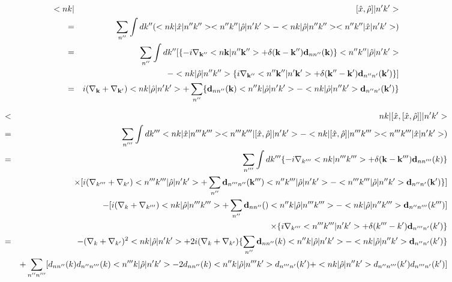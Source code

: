 \documentclass[aps,prb,preprint]{revtex4-1}
\begin{document}
\begin{appendix}
\begin{eqnarray}
<nk|&&[\hat{x},\hat{\rho}]|n'k'> \nonumber \\
=&& \sum_{n''} \int dk'' (<nk|\hat{x}|n''k''><n''k''|\hat{\rho}|n'k'> - <nk|\hat{\rho}|n''k''><n''k''|\hat{x}|n'k'>) \nonumber \\
=&& \sum_{n''} \int dk'' [ \{ -i \nabla_{\bf k''} <n{\bf k}|n''{\bf k''}> + \delta({\bf k-k''}) {\bf d}_{nn''}({\bf k}) \}<n''k''|\hat{\rho}|n'k'> \nonumber \\
&& - <nk|\hat{\rho}|n''k''>\{ i \nabla_{\bf k''} <n''{\bf k''}|n'{\bf k'}> + \delta({\bf k''-k'}) {\bf d}_{n''n'}({\bf k'}) \} ] \nonumber \\
=&& i (\nabla_{\bf k} + \nabla_{\bf k'}) <nk|\hat{\rho}|n'k'> + \sum_{n''} \{ {\bf d}_{nn''}({\bf k}) <n''k|\hat{\rho}|n'k'> - <nk|\hat{\rho}|n''k'> {\bf d}_{n''n'}({\bf k'}) \}  \nonumber \\
\end{eqnarray} 

\begin{eqnarray}
<&&nk|[\hat{x}, [\hat{x},\hat{\rho}]]|n'k'> \nonumber \\
=&& \sum_{n'''} \int dk''' <nk|\hat{x}|n'''k'''><n'''k'''|[\hat{x},\hat{\rho}]|n'k'>  - <nk| [\hat{x},\hat{\rho}]|n'''k'''><n'''k'''|\hat{x}|n'k'>) \nonumber \\
=&& \sum_{n'''} \int dk''' \{ -i \nabla_{k'''} <nk|n'''k'''> + \delta({\bf k-k'''}) {\bf d}_{nn'''}({k})\} \nonumber \\ 
&& \times [ i (\nabla_{k'''} + \nabla_{k'}) <n'''k'''|\hat{\rho}|n'k'> + \sum_{n''} {\bf d}_{n'''n''}({\bf k'''}) <n''k'''|\hat{\rho}|n'k'> - <n'''k'''|\hat{\rho}|n''k'> {\bf d}_{n''n'}({\bf k'})\} ]\nonumber \\
 && - [ i (\nabla_{k} + \nabla_{k'''}) <nk|\hat{\rho}|n'''k'''> + \sum_{n''} {\bf d}_{nn''}() <n''k|\hat{\rho}|n'''k'''> - <nk|\hat{\rho}|n''k'''> {\bf d}_{n''n'''}(k''') ]\nonumber \\
 && \times \{ i \nabla_{k'''} <n'''k'''|n'k'> + \delta(k'''-k') {\bf d}_{n'''n'}(k')\} \nonumber \\
 =&& - (\nabla_{k} + \nabla_{k'})^2 <nk|\hat{\rho}|n'k'> + 2i(\nabla_{k} + \nabla_{k'})\{ \sum_{n''} {\bf d}_{nn''}({k}) <n''k|\hat{\rho}|n'k'> - <nk|\hat{\rho}|n''k'> {\bf d}_{n''n'}({k'})\} \nonumber \\
 && +\sum_{n''n'''} [ d_{nn''}(k) d_{n''n'''}(k) <n'''k|\hat{\rho}|n'k'> - 2 d_{nn''}(k) <n''k|\hat{\rho}|n'''k'> d_{n'''n'}(k') + <nk|\hat{\rho}|n''k'> d_{n''n'''}(k') d_{n'''n'}(k')]\nonumber \\
\end{eqnarray} 



\end{appendix}
\end{document}
